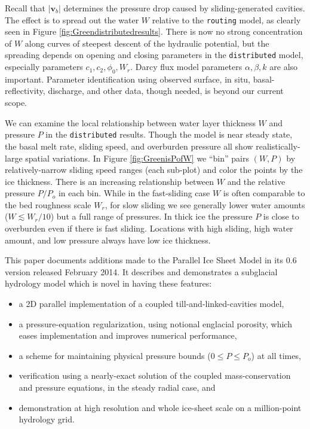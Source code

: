 \documentclass[gmd]{copernicus}   %
\begin{document}
Recall that $|\mathbf{v}_b|$ determines the pressure drop caused by sliding-generated cavities.  The effect is to spread out the water $W$ relative to the \texttt{routing} model, as clearly seen in Figure \ref{fig:Greendistributedresults}.  There is now no strong concentration of $W$ along curves of steepest descent of the hydraulic potential, but the spreading depends on opening and closing parameters in the \texttt{distributed} model, especially parameters $c_1,c_2,\phi_0,W_r$.  Darcy flux model parameters $\alpha,\beta,k$ are also important.  Parameter identification using observed surface, in situ, basal-reflectivity, discharge, and other data, though needed, is beyond our current scope.

We can examine the local relationship between water layer thickness $W$ and pressure $P$ in the \texttt{distributed} results.  Though the model is near steady state, the basal melt rate, sliding speed, and overburden pressure all show realistically-large spatial variations.  In Figure \ref{fig:GreenisPofW} we ``bin'' pairs $(W,P)$ by relatively-narrow sliding speed ranges (each sub-plot) and color the points by the ice thickness.  There is an increasing relationship between $W$ and the relative pressure $P/P_o$ in each bin.  While in the fast-sliding case $W$ is often comparable to the bed roughness scale $W_r$, for slow sliding we see generally lower water amounts ($W \lesssim W_r/10$) but a full range of pressures.  In thick ice the pressure $P$ is close to overburden even if there is fast sliding.  Locations with high sliding, high water amount, and low pressure always have low ice thickness.

\conclusions  \label{sec:conclusion}  This paper documents additions made to the Parallel Ice Sheet Model in its 0.6 version released February 2014.  It describes and demonstrates a subglacial hydrology model which is novel in having these features:\begin{itemize}
\item a 2D parallel implementation of a coupled till-and-linked-cavities model,
\item a pressure-equation regularization, using notional englacial porosity, which eases implementation and improves numerical performance,
\item a scheme for maintaining physical pressure bounds ($0\le P \le P_o$) at all times,
\item verification using a nearly-exact solution of the coupled mass-conservation and pressure equations, in the steady radial case, and
\item demonstration at high resolution and whole ice-sheet scale on a million-point hydrology grid.
\end{itemize}
\end{document}
